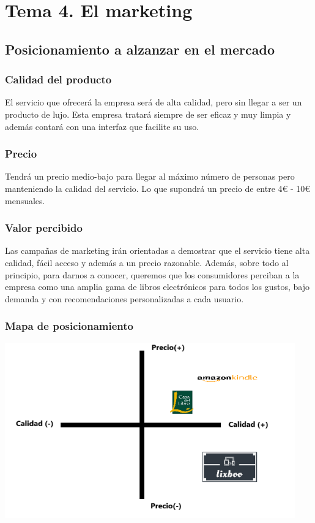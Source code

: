 \documentclass[openany,overnay,a4paper, twoside, 12pt]{book}
\begin{document}
\setcounter{chapter}{4} %
\chapter*{Tema 4. El marketing}
\setcounter{section}{0}
\section{Posicionamiento a alzanzar en el mercado}
\subsection{Calidad del producto}
El servicio que ofrecerá la empresa será de alta calidad, pero sin llegar a ser un producto de lujo. Esta empresa tratará siempre de ser eficaz y muy limpia y además contará con una interfaz que facilite su uso.
\subsection{Precio}
Tendrá un precio medio-bajo para llegar al máximo número de personas pero manteniendo la calidad del servicio. Lo que supondrá un precio de entre 4€ - 10€ mensuales.
\subsection{Valor percibido}
Las campañas de marketing irán orientadas a demostrar que el servicio tiene alta calidad, fácil acceso y además a un precio razonable. Además, sobre todo al principio, para darnos a conocer, queremos que los consumidores perciban a la empresa como una amplia gama de libros electrónicos para todos los gustos, bajo demanda y con recomendaciones personalizadas a cada usuario.
\subsection{Mapa de posicionamiento}
\includegraphics[scale = 0.9]{imagenes/mapa de posicionamiento.png}
\end{document}
